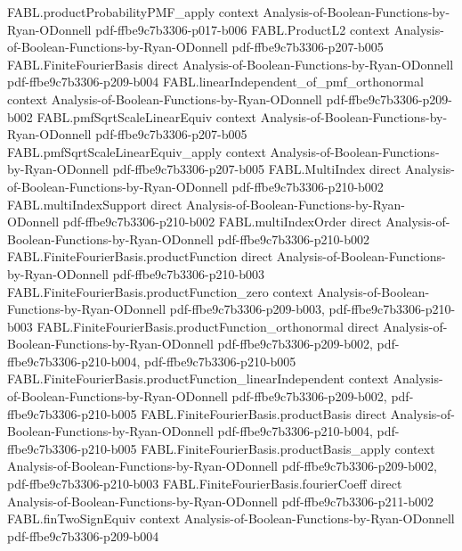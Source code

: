 \begin{theorem}
\proofstep
  {FABL.productProbabilityPMF_apply}
  {context}
  {Analysis-of-Boolean-Functions-by-Ryan-ODonnell}
  {pdf-ffbe9c7b3306-p017-b006}
\proofstep
  {FABL.ProductL2}
  {context}
  {Analysis-of-Boolean-Functions-by-Ryan-ODonnell}
  {pdf-ffbe9c7b3306-p207-b005}
\proofstep
  {FABL.FiniteFourierBasis}
  {direct}
  {Analysis-of-Boolean-Functions-by-Ryan-ODonnell}
  {pdf-ffbe9c7b3306-p209-b004}
\proofstep
  {FABL.linearIndependent_of_pmf_orthonormal}
  {context}
  {Analysis-of-Boolean-Functions-by-Ryan-ODonnell}
  {pdf-ffbe9c7b3306-p209-b002}
\proofstep
  {FABL.pmfSqrtScaleLinearEquiv}
  {context}
  {Analysis-of-Boolean-Functions-by-Ryan-ODonnell}
  {pdf-ffbe9c7b3306-p207-b005}
\proofstep
  {FABL.pmfSqrtScaleLinearEquiv_apply}
  {context}
  {Analysis-of-Boolean-Functions-by-Ryan-ODonnell}
  {pdf-ffbe9c7b3306-p207-b005}
\proofstep
  {FABL.MultiIndex}
  {direct}
  {Analysis-of-Boolean-Functions-by-Ryan-ODonnell}
  {pdf-ffbe9c7b3306-p210-b002}
\proofstep
  {FABL.multiIndexSupport}
  {direct}
  {Analysis-of-Boolean-Functions-by-Ryan-ODonnell}
  {pdf-ffbe9c7b3306-p210-b002}
\proofstep
  {FABL.multiIndexOrder}
  {direct}
  {Analysis-of-Boolean-Functions-by-Ryan-ODonnell}
  {pdf-ffbe9c7b3306-p210-b002}
\proofstep
  {FABL.FiniteFourierBasis.productFunction}
  {direct}
  {Analysis-of-Boolean-Functions-by-Ryan-ODonnell}
  {pdf-ffbe9c7b3306-p210-b003}
\proofstep
  {FABL.FiniteFourierBasis.productFunction_zero}
  {context}
  {Analysis-of-Boolean-Functions-by-Ryan-ODonnell}
  {pdf-ffbe9c7b3306-p209-b003,
    pdf-ffbe9c7b3306-p210-b003}
\proofstep
  {FABL.FiniteFourierBasis.productFunction_orthonormal}
  {direct}
  {Analysis-of-Boolean-Functions-by-Ryan-ODonnell}
  {pdf-ffbe9c7b3306-p209-b002,
    pdf-ffbe9c7b3306-p210-b004,
    pdf-ffbe9c7b3306-p210-b005}
\proofstep
  {FABL.FiniteFourierBasis.productFunction_linearIndependent}
  {context}
  {Analysis-of-Boolean-Functions-by-Ryan-ODonnell}
  {pdf-ffbe9c7b3306-p209-b002,
    pdf-ffbe9c7b3306-p210-b005}
\proofstep
  {FABL.FiniteFourierBasis.productBasis}
  {direct}
  {Analysis-of-Boolean-Functions-by-Ryan-ODonnell}
  {pdf-ffbe9c7b3306-p210-b004,
    pdf-ffbe9c7b3306-p210-b005}
\proofstep
  {FABL.FiniteFourierBasis.productBasis_apply}
  {context}
  {Analysis-of-Boolean-Functions-by-Ryan-ODonnell}
  {pdf-ffbe9c7b3306-p209-b002,
    pdf-ffbe9c7b3306-p210-b003}
\proofstep
  {FABL.FiniteFourierBasis.fourierCoeff}
  {direct}
  {Analysis-of-Boolean-Functions-by-Ryan-ODonnell}
  {pdf-ffbe9c7b3306-p211-b002}
\proofstep
  {FABL.finTwoSignEquiv}
  {context}
  {Analysis-of-Boolean-Functions-by-Ryan-ODonnell}
  {pdf-ffbe9c7b3306-p209-b004}

\end{theorem}

